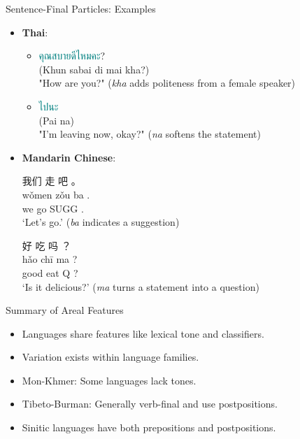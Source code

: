 \documentclass{beamer}
\newcommand{\mtplain}[1]{\textcolor{teal}{#1}}
\newcommand{\tha}[1]{\mtplain{\textthai{#1}}}
\begin{document}
\begin{frame}{Sentence-Final Particles: Examples}
  \begin{itemize}
  \item \textbf{Thai}:
    \begin{itemize}
    \item \tha{คุณสบายดีไหมคะ}? \\
      (Khun sabai di mai kha?) \\
      "How are you?" (\textit{kha} adds politeness from a female speaker)
    \item \tha{ไปนะ} \\
      (Pai na) \\
      "I'm leaving now, okay?" (\textit{na} softens the statement)
    \end{itemize}
  \item \textbf{Mandarin Chinese}:
    \begin{exe}
      \ex \gll 我们 走 吧 。\\
      wǒmen zǒu ba .\\
      we go SUGG .\\
      \trans `Let's go.' (\textit{ba} indicates a suggestion)
      
      \ex \gll 好 吃 吗 ？\\
      hǎo chī ma ? \\
      good eat Q ? \\
      \trans `Is it delicious?' (\textit{ma} turns a statement into a question)
    \end{exe}
  \end{itemize}
\end{frame}

\begin{frame}{Summary of Areal Features}
    \begin{itemize}
        \item Languages share features like lexical tone and classifiers.
        \item Variation exists within language families.
        \item Mon-Khmer: Some languages lack tones.
        \item Tibeto-Burman: Generally verb-final and use postpositions.
        \item Sinitic languages have both prepositions and postpositions.
    \end{itemize}
\end{frame}
\end{document}
